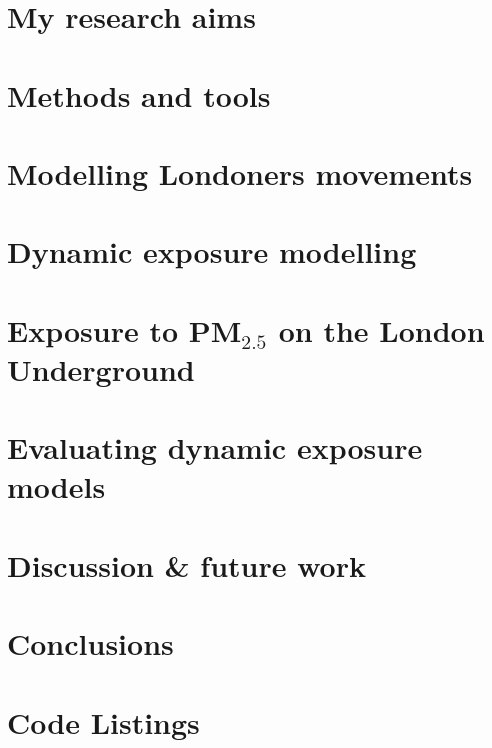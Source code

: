 \documentclass[12pt]{report}
\begin{document}
\chapter{My research aims}


\chapter{Methods and tools}


\chapter{Modelling Londoners movements}
\label{chap:the_ltdsx}


\chapter{Dynamic exposure modelling}
\label{chap:the_lhem}


\chapter{Exposure to \texorpdfstring{PM$_{2.5}$}{} on the London Underground}
\label{chap:monitoring_on_underground}


\chapter{Evaluating dynamic exposure models}
\label{chap:evaluating_dynamic_exposure_models}


\chapter{Discussion \& future work}


\chapter{Conclusions}





\appendix

\chapter{Code Listings}

\end{document}

